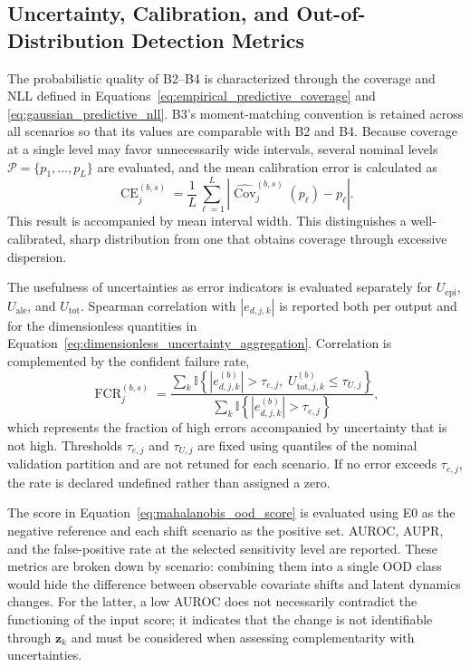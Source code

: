 \documentclass[12pt,a4paper]{report}
\begin{document}
\subsection{Uncertainty, Calibration, and Out-of-Distribution Detection Metrics}
\label{sec:metricas_incertidumbre_ood}

The probabilistic quality of B2--B4 is characterized through the coverage and NLL defined in Equations~\eqref{eq:empirical_predictive_coverage} and \eqref{eq:gaussian_predictive_nll}. B3's moment-matching convention is retained across all scenarios so that its values are comparable with B2 and B4. Because coverage at a single level may favor unnecessarily wide intervals, several nominal levels $\mathcal{P}=\{p_1,\ldots,p_L\}$ are evaluated, and the mean calibration error is calculated as
\begin{equation}
    \operatorname{CE}^{(b,s)}_j
    =
    \frac{1}{L}
    \sum_{\ell=1}^{L}
    \left|
        \widehat{\operatorname{Cov}}^{(b,s)}_j(p_\ell)-p_\ell
    \right|.
    \label{eq:mean_calibration_error}
\end{equation}
This result is accompanied by mean interval width. This distinguishes a well-calibrated, sharp distribution from one that obtains coverage through excessive dispersion.

The usefulness of uncertainties as error indicators is evaluated separately for $U_{\mathrm{epi}}$, $U_{\mathrm{ale}}$, and $U_{\mathrm{tot}}$. Spearman correlation with $|e_{d,j,k}|$ is reported both per output and for the dimensionless quantities in Equation~\eqref{eq:dimensionless_uncertainty_aggregation}. Correlation is complemented by the confident failure rate,
\begin{equation}
    \operatorname{FCR}^{(b,s)}_j
    =
    \frac{
        \sum_k
        \mathbb I\!\left\{
            |e^{(b)}_{d,j,k}|>\tau_{e,j},\;
            U^{(b)}_{\mathrm{tot},j,k}\leq\tau_{U,j}
        \right\}
    }{
        \sum_k
        \mathbb I\!\left\{
            |e^{(b)}_{d,j,k}|>\tau_{e,j}
        \right\}
    },
    \label{eq:confident_failure_rate}
\end{equation}
which represents the fraction of high errors accompanied by uncertainty that is not high. Thresholds $\tau_{e,j}$ and $\tau_{U,j}$ are fixed using quantiles of the nominal validation partition and are not retuned for each scenario. If no error exceeds $\tau_{e,j}$, the rate is declared undefined rather than assigned a zero.

The score in Equation~\eqref{eq:mahalanobis_ood_score} is evaluated using E0 as the negative reference and each shift scenario as the positive set. AUROC, AUPR, and the false-positive rate at the selected sensitivity level are reported. These metrics are broken down by scenario: combining them into a single OOD class would hide the difference between observable covariate shifts and latent dynamics changes. For the latter, a low AUROC does not necessarily contradict the functioning of the input score; it indicates that the change is not identifiable through $\mathbf z_k$ and must be considered when assessing complementarity with uncertainties.
\end{document}
